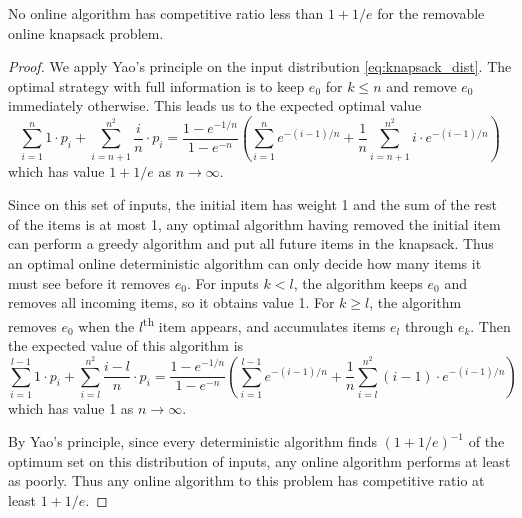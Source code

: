 \begin{theorem}
	\emph{\cite{han}}
	No online algorithm has competitive ratio less than $1+1/e$ for the removable online knapsack problem.
\end{theorem}
\begin{proof}
	We apply Yao's principle on the input distribution \eqref{eq:knapsack_dist}. The optimal strategy with full information is to keep $e_0$ for $k\le n$ and remove $e_0$ immediately otherwise. This leads us to the expected optimal value
	\[ \sum_{i=1}^n 1\cdot p_i + \sum_{i=n+1}^{n^2} \frac{i}{n}\cdot p_i = \frac{1-e^{-1/n}}{1-e^{-n}} \left( \sum_{i=1}^n e^{-(i-1)/n} + \frac{1}{n} \sum_{i=n+1}^{n^2} i\cdot e^{-(i-1)/n} \right) \]
	which has value $1+1/e$ as $n \rightarrow \infty$.

	Since on this set of inputs, the initial item has weight 1 and the sum of the rest of the items is at most 1, any optimal algorithm having removed the initial item can perform a greedy algorithm and put all future items in the knapsack. Thus an optimal online deterministic algorithm can only decide how many items it must see before it removes $e_0$. For inputs $k<l$, the algorithm keeps $e_0$ and removes all incoming items, so it obtains value 1. For $k\ge l$, the algorithm removes $e_0$ when the $l$\textsuperscript{th} item appears, and accumulates items $e_l$ through $e_k$. Then the expected value of this algorithm is
	\[ \sum_{i=1}^{l-1} 1\cdot p_i + \sum_{i=l}^{n^2} \frac{i-l}{n}\cdot p_i = \frac{1-e^{-1/n}}{1-e^{-n}} \left( \sum_{i=1}^{l-1} e^{-(i-1)/n} + \frac{1}{n} \sum_{i=l}^{n^2} (i-1)\cdot e^{-(i-1)/n} \right) \]
which has value 1 as $n \rightarrow \infty$.

By Yao's principle, since every deterministic algorithm finds $(1+1/e)^{-1}$ of the optimum set on this distribution of inputs, any online algorithm performs at least as poorly. Thus any online algorithm to this problem has competitive ratio at least $1+1/e$.
\end{proof}


